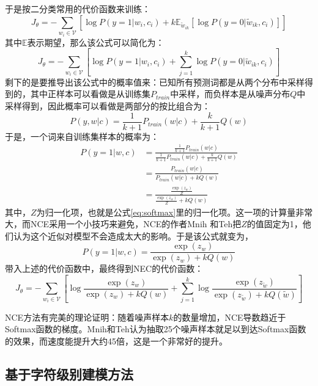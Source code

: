 \documentclass[12pt,a4paper]{article}
\begin{document}
于是按二分类常用的代价函数来训练：
\begin{equation}
J_\theta = -\sum\limits_{w_i \in \mathcal{V}}{[\log P(y=1|w_i, c_i) + k\mathbb{E}_{\tilde{w}_{ik}}[\log P(y=0|\tilde{w}_{ik}, c_i)]]}
\end{equation}
其中$\mathbb{E}$表示期望，那么该公式可以简化为：
\begin{equation}
J_\theta = -\sum\limits_{w_i \in \mathcal{V}}{[\log P(y=1|w_i, c_i) + \sum\limits_{j=1}^k{\log P(y=0|\tilde{w}_{ik}, c_i)}]}
\end{equation}
剩下的是要推导出该公式中的概率值来：已知所有预测词都是从两个分布中采样得到的，其中正样本可以看做是从训练集${P_{train}}$中采样，而负样本是从噪声分布$Q$中采样得到，因此概率可以看做是两部分的按比组合为：
\begin{equation}
P(y,w|c) = \frac{1}{k+1} P_{train}(w|c) + \frac{k}{k+1}Q(w)
\end{equation}
于是，一个词来自训练集样本的概率为：
\begin{equation}
\begin{split}
P(y=1|w,c) &=  \frac{\frac{1}{k+1} P_{train}(w|c)}{\frac{1}{k+1} P_{train}(w|c) + \frac{k}{k+1}Q(w)} \\
           &= \frac{P_{train}(w|c)}{P_{train}(w|c) + kQ(w)} \\
           &= \frac{\frac{\exp(z_w)}{Z}}{\frac{\exp(z_w)}{Z} + kQ(w)}
\end{split}
\end{equation}
其中，$Z$为归一化项，也就是公式\ref{eq:softmax}里的归一化项。这一项的计算量非常大，而NCE采用一个小技巧来避免，NCE的作者Mnih 和Teh把$Z$的值固定为1，他们认为这个近似对模型不会造成太大的影响。于是该公式就变为，
\begin{equation}
  P(y=1|w,c) = \frac{\exp(z_w)}{\exp(z_w) + kQ(w)}
\end{equation}
带入上述的代价函数中，最终得到NEC的代价函数：
\begin{equation}
J_\theta = -\sum\limits_{w_i \in \mathcal{V}}{\left[\log \frac{\exp(z_w)}{\exp(z_w) + kQ(w)} + \sum\limits_{j=1}^k{\log \frac{\exp(z_{\tilde{w}})}{\exp(z_{\tilde{w}}) + kQ(\tilde{w})}}\right]}
\end{equation}

NCE方法有完美的理论证明：随着噪声样本$k$的数量增加，NCE导数趋近于Softmax函数的梯度。Mnih和Teh认为抽取25个噪声样本就足以到达Softmax函数的效果，而速度能提升大约45倍，这是一个非常好的提升\cite{DBLP:conf/icml/MnihT12}。
\subsection{基于字符级别建模方法}
\end{document}
